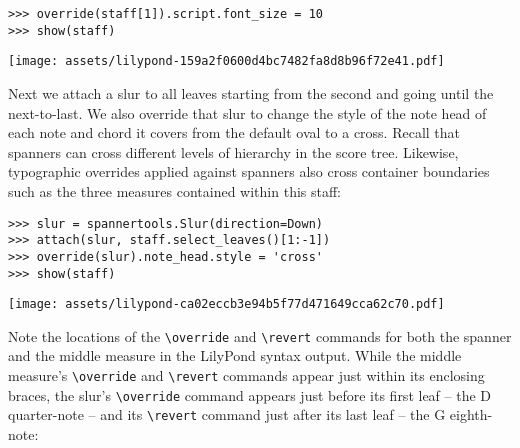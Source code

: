 \begin{abjadbookoutput}
\begin{singlespacing}
\vspace{-0.5\baselineskip}
\begin{verbatim}
>>> override(staff[1]).script.font_size = 10
>>> show(staff)
\end{verbatim}
\noindent\texttt{[image: assets/lilypond-159a2f0600d4bc7482fa8d8b96f72e41.pdf]}
\end{singlespacing}
\end{abjadbookoutput}

\noindent Next we attach a slur to all leaves starting from the second and
going until the next-to-last. We also override that slur to change the style of
the note head of each note and chord it covers from the default oval to a
cross. Recall that spanners can cross different levels of hierarchy in the
score tree. Likewise, typographic overrides applied against spanners also
cross container boundaries such as the three measures contained within this
staff:

\begin{comment}
<abjad>
slur = spannertools.Slur(direction=Down)
attach(slur, staff.select_leaves()[1:-1])
override(slur).note_head.style = 'cross'
show(staff)
</abjad>
\end{comment}

\begin{abjadbookoutput}
\begin{singlespacing}
\vspace{-0.5\baselineskip}
\begin{verbatim}
>>> slur = spannertools.Slur(direction=Down)
>>> attach(slur, staff.select_leaves()[1:-1])
>>> override(slur).note_head.style = 'cross'
>>> show(staff)
\end{verbatim}
\noindent\texttt{[image: assets/lilypond-ca02eccb3e94b5f77d471649cca62c70.pdf]}
\end{singlespacing}
\end{abjadbookoutput}

\noindent Note the locations of the \texttt{\textbackslash{}override} and
\texttt{\textbackslash{}revert} commands for both the spanner and the middle
measure in the LilyPond syntax output. While the middle measure's
\texttt{\textbackslash{}override} and \texttt{\textbackslash{}revert} commands
appear just within its enclosing braces, the slur's
\texttt{\textbackslash{}override} command appears just before its first leaf --
the D quarter-note -- and its \texttt{\textbackslash{}revert} command just
after its last leaf -- the G eighth-note:

